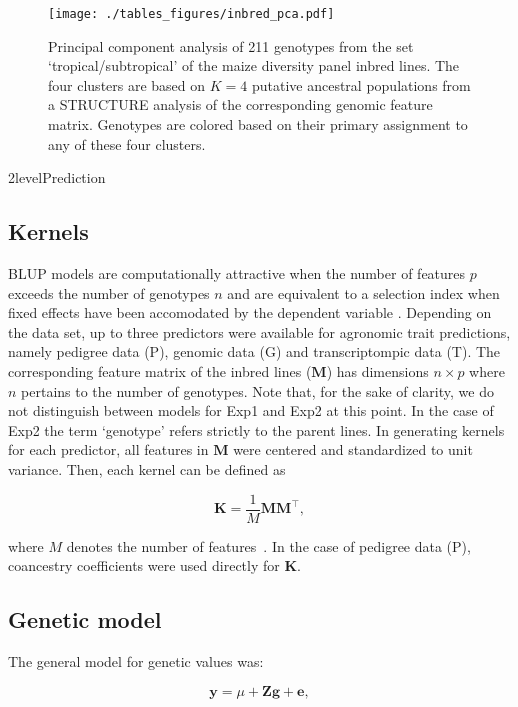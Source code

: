 \documentclass[12pt,titlepage]{article}
\begin{document}
\begin{figure}[H]
  \centering
  \texttt{[image: ./tables\_figures/inbred\_pca.pdf]}
  \caption{
  Principal component analysis of 211 genotypes from the set
  `tropical/subtropical' of the maize diversity panel inbred lines.
  The four clusters are based on $K=4$ putative ancestral populations from a
  STRUCTURE analysis of the corresponding genomic feature matrix.
  Genotypes are colored based on their primary assignment to any of these four
  clusters.
}
\label{fig:inbred-pca}
\end{figure}



\Genetics2level{Prediction}
\subsection{Kernels}
BLUP models are computationally attractive when the number of features $p$
exceeds the number of genotypes $n$ and are equivalent to a selection index
when fixed effects have been accomodated by the dependent variable 
\cite{Mrode2014}.
Depending on the data set, up to three predictors were available for agronomic
trait predictions, namely pedigree data (P), genomic data (G) and
transcriptompic data (T).
The corresponding feature matrix of the inbred lines ($\mathbf{M}$) has
dimensions $n \times p$ where $n$ pertains to the number of genotypes.
Note that, for the sake of clarity, we do not distinguish between models for
Exp1 and Exp2 at this point.
In the case of Exp2 the term `genotype' refers strictly to the parent lines.
In generating kernels for each predictor, all features in $\mathbf{M}$ were
centered and standardized to unit variance.
Then, each kernel can be defined as

\begin{equation} \label{eq:GenomicRelationship}
  \mathbf{K} = \frac{1}{M} \mathbf{M} \mathbf{M}^{\top},
\end{equation}

where $M$ denotes the number of features~\cite{VanRaden2008}.
In the case of pedigree data (P), coancestry coefficients were used directly
for $\mathbf{K}$.


\subsection{Genetic model}
The general model for genetic values was:

\begin{equation} \label{eq:KBLUPModel}
  \mathbf{y} = \mu + \mathbf{Z} \mathbf{g} + \mathbf{e},
\end{equation}
\end{document}
